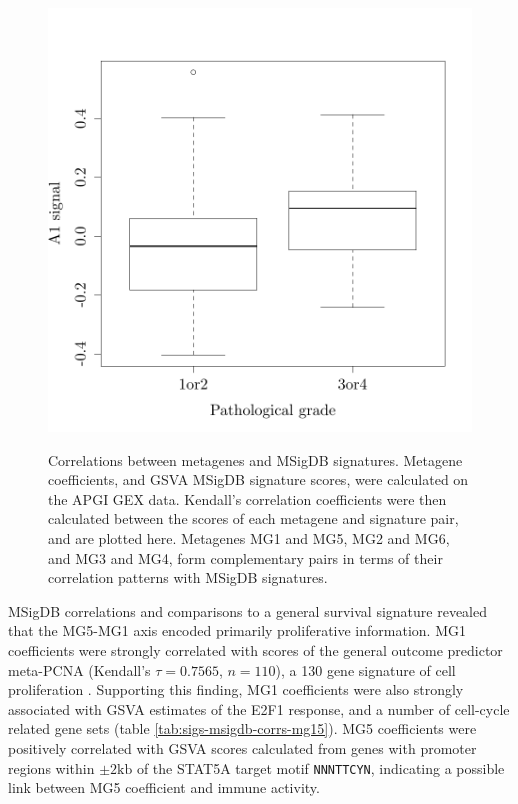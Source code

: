 \documentclass[dissertation.tex]{subfiles}
\begin{document}
\begin{figure}
\centering
\includegraphics[width=.7\linewidth]{analysis/biosurv/reports/18_SIS_diag_dsd_final/figure/nmf-msigdb-cor-plots-1}
\label{fig:sigs-nmf-corplots}
\caption{Correlations between metagenes and \acrshort{MSigDB} signatures.  Metagene coefficients, and \acrshort{GSVA} \acrshort{MSigDB} signature scores, were calculated on the \acrshort{APGI} \acrshort{GEX} data.  Kendall's correlation coefficients were then calculated between the scores of each metagene and signature pair, and are plotted here.  Metagenes MG1 and MG5, MG2 and MG6, and MG3 and MG4, form complementary pairs in terms of their correlation patterns with \acrshort{MSigDB} signatures.}
\end{figure}

\gls{MSigDB} correlations and comparisons to a general survival signature revealed that the MG5-MG1 axis encoded primarily proliferative information.  MG1 coefficients were strongly correlated with scores of the general outcome predictor meta-PCNA (Kendall's $\tau = 0.7565$, $n = 110$), a 130 gene signature of cell proliferation \cite{Venet2011}.  Supporting this finding, MG1 coefficients were also strongly associated with \gls{GSVA} estimates of the E2F1 response, and a number of cell-cycle related gene sets (table \ref{tab:sigs-msigdb-corrs-mg15}).  MG5 coefficients were positively correlated with \gls{GSVA} scores calculated from genes with promoter regions within $\pm 2 \text{kb}$ of the STAT5A target motif \texttt{NNNTTCYN}, indicating a possible link between MG5 coefficient and immune activity.
\end{document}
